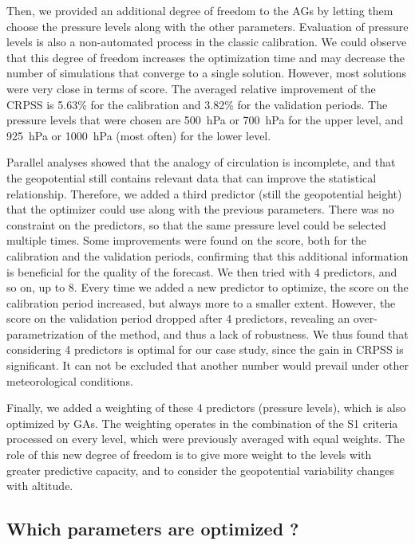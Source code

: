 \documentclass{ametsoc}
\begin{document}
Then, we provided an additional degree of freedom to the AGs by letting them choose the pressure levels along with the other parameters. Evaluation of pressure levels is also a non-automated process in the classic calibration. We could observe that this degree of freedom increases the optimization time and may decrease the number of simulations that converge to a single solution. However, most solutions were very close in terms of score. The averaged relative improvement of the CRPSS is 5.63\% for the calibration and 3.82\% for the validation periods. The pressure levels that were chosen are 500~hPa or 700~hPa for the upper level, and 925~hPa or 1000~hPa (most often) for the lower level.

Parallel analyses showed that the analogy of circulation is incomplete, and that the geopotential still contains relevant data that can improve the statistical relationship. Therefore, we added a third predictor (still the geopotential height) that the optimizer could use along with the previous parameters. There was no constraint on the predictors, so that the same pressure level could be selected multiple times. Some improvements were found on the score, both for the calibration and the validation periods, confirming that this additional information is beneficial for the quality of the forecast. We then tried with 4 predictors, and so on, up to 8. Every time we added a new predictor to optimize, the score on the calibration period increased, but always more to a smaller extent. However, the score on the validation period dropped after 4 predictors, revealing an over-parametrization of the method, and thus a lack of robustness. We thus found that considering 4 predictors is optimal for our case study, since the gain in CRPSS is significant. It can not be excluded that another number would prevail under other meteorological conditions.

Finally, we added a weighting of these 4 predictors (pressure levels), which is also optimized by GAs. The weighting operates in the combination of the S1 criteria processed on every level, which were previously averaged with equal weights. The role of this new degree of freedom is to give more weight to the levels with greater predictive capacity, and to consider the geopotential variability changes with altitude. 


\subsection{Which parameters are optimized ?}
\end{document}
